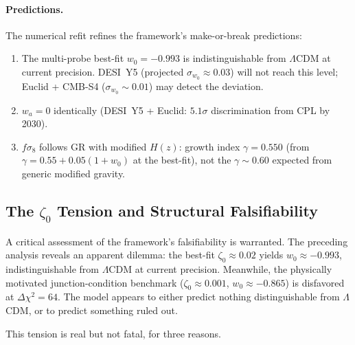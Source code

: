 \paragraph{Predictions.} The numerical refit refines the framework's make-or-break predictions:
\begin{enumerate}
\item The multi-probe best-fit $w_0 = -0.993$ is indistinguishable from $\Lambda$CDM at current precision. DESI~Y5 (projected $\sigma_{w_0} \approx 0.03$) will not reach this level; Euclid + CMB-S4 ($\sigma_{w_0} \sim 0.01$) may detect the deviation.
\item $w_a = 0$ identically (DESI~Y5 + Euclid: $5.1\sigma$ discrimination from CPL by 2030).
\item $f\sigma_8$ follows GR with modified $H(z)$: growth index $\gamma = 0.550$ (from $\gamma = 0.55 + 0.05(1+w_0)$ at the best-fit), not the $\gamma \sim 0.60$ expected from generic modified gravity.
\end{enumerate}

\subsection{The $\zeta_0$ Tension and Structural Falsifiability}
\label{sec:2-zeta0-tension}

A critical assessment of the framework's falsifiability is warranted. The preceding analysis reveals an apparent dilemma: the best-fit $\zeta_0 \approx 0.02$ yields $w_0 \approx -0.993$, indistinguishable from $\Lambda$CDM at current precision. Meanwhile, the physically motivated junction-condition benchmark ($\zeta_0 \approx 0.001$, $w_0 \approx -0.865$) is disfavored at $\Delta\chi^2 = 64$. The model appears to either predict nothing distinguishable from $\Lambda$CDM, or to predict something ruled out.

This tension is real but not fatal, for three reasons.

